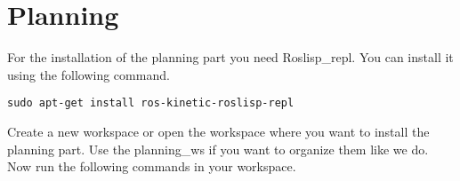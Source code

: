 \documentclass[main.tex]{subfiles}
\begin{document}
	\section{Planning}
	\label{sec:Planning}
	For the installation of the planning part you need Roslisp\_repl.
	You can install it using the following command.\\
	\begin{lstlisting}
sudo apt-get install ros-kinetic-roslisp-repl 
\end{lstlisting}

	Create a new workspace or open the workspace where you want to install the planning part. Use the planning\_ws if you want to organize them like we do. Now run the following commands in your workspace.\\
\begin{mdframed}[backgroundcolor=mygray, rightline=false]

\end{mdframed}
	
	
\end{document}
